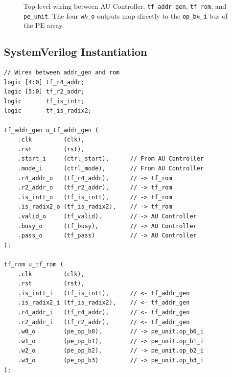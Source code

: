 \documentclass[11pt,a4paper]{article}
\newcommand{\sv}[1]{\texttt{#1}}
\newcommand{\port}[1]{\texttt{#1}}
\begin{document}
\begin{figure}[H]
\caption{Top-level wiring between AU Controller, \sv{tf\_addr\_gen}, \sv{tf\_rom},
  and \sv{pe\_unit}. The four \port{w$k$\_o} outputs map directly to the
  \port{op\_b$k$\_i} bus of the PE array.}
\label{fig:top-level}
\end{figure}

\subsection{SystemVerilog Instantiation}

\begin{lstlisting}
// Wires between addr_gen and rom
logic [4:0] tf_r4_addr;
logic [5:0] tf_r2_addr;
logic       tf_is_intt;
logic       tf_is_radix2;

tf_addr_gen u_tf_addr_gen (
    .clk         (clk),
    .rst         (rst),
    .start_i     (ctrl_start),      // From AU Controller
    .mode_i      (ctrl_mode),       // From AU Controller
    .r4_addr_o   (tf_r4_addr),      // -> tf_rom
    .r2_addr_o   (tf_r2_addr),      // -> tf_rom
    .is_intt_o   (tf_is_intt),      // -> tf_rom
    .is_radix2_o (tf_is_radix2),    // -> tf_rom
    .valid_o     (tf_valid),        // -> AU Controller
    .busy_o      (tf_busy),         // -> AU Controller
    .pass_o      (tf_pass)          // -> AU Controller
);

tf_rom u_tf_rom (
    .clk         (clk),
    .rst         (rst),
    .is_intt_i   (tf_is_intt),      // <- tf_addr_gen
    .is_radix2_i (tf_is_radix2),    // <- tf_addr_gen
    .r4_addr_i   (tf_r4_addr),      // <- tf_addr_gen
    .r2_addr_i   (tf_r2_addr),      // <- tf_addr_gen
    .w0_o        (pe_op_b0),        // -> pe_unit.op_b0_i
    .w1_o        (pe_op_b1),        // -> pe_unit.op_b1_i
    .w2_o        (pe_op_b2),        // -> pe_unit.op_b2_i
    .w3_o        (pe_op_b3)         // -> pe_unit.op_b3_i
);
\end{lstlisting}
\end{document}
